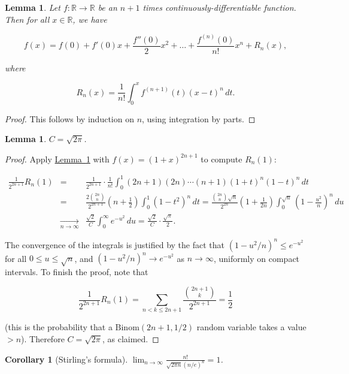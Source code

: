 \documentclass[11pt]{report}
\newcommand{\R}{\mathbb{R}}
\theoremstyle{plain}
\newtheorem{lem}[thm]{Lemma}
\newtheorem{cor}[thm]{Corollary}
\theoremstyle{definition}
\begin{document}
\begin{lem}
\label{lem-prevlemma}
Let $f:\R\to\R$ be an $n+1$ times
continuously-differentiable function. Then for all
$x\in\R$, we have

\[
f(x) = f(0) + f'(0)x + \frac{f''(0)}{2}x^2 + \ldots + \frac{f^{(n)}(0)}{n!} x^n + R_n(x),
\]

\noindent where

\[
R_n(x) = \frac{1}{n!} \int_0^x f^{(n+1)}(t)(x-t)^n\,dt.
\]

\end{lem}

\begin{proof}
This follows by induction on $n$, using integration
by parts.
\end{proof}

\begin{lem}
$C=\sqrt{2\pi}$.
\end{lem}

\begin{proof}
Apply \hyperref[lem-prevlemma]{Lemma~\ref*{lem-prevlemma}} with $f(x) = (1+x)^{2n+1}$
to compute $R_n(1)$:

\begin{eqnarray*}
\frac{1}{2^{2n+1}} R_n(1) &=& \frac{1}{2^{2n+1}} \cdot \frac{1}{n!}\int_0^1 (2n+1)(2n)\cdots (n+1)(1+t)^n (1-t)^n
\,dt \\ &=& \frac{2 \binom{2n}{n}}{2^{2n+1}} (n+\frac12) \int_0^1 (1-t^2)^n\, dt = \frac{ \binom{2n}{n} \sqrt{n}}{2^{2n}}
(1+\frac{1}{2n}) \int_0^{\sqrt{n}} \left(1-\frac{u^2}{n}\right)^n\,du \\
&\xrightarrow[n\to\infty]{} & \frac{\sqrt{2}}{C} \int_0^\infty e^{-u^2}\,du = \frac{\sqrt{2}}{C} \cdot \frac{\sqrt{\pi}}{2}.
\end{eqnarray*}

\noindent The convergence of the integrals is justified by the
fact that $(1-u^2/n)^n \le e^{-u^2}$ for all
$0\le u\le \sqrt{n}$, and $(1-u^2/n)^n \to e^{-u^2}$
as $n\to\infty$, uniformly on compact intervals. To
finish the proof, note that

\[
\frac{1}{2^{2n+1}} R_n(1) = \sum_{n<k\le 2n+1} \frac{\binom{2n+1}{k}}{2^{2n+1}} = \frac12
\]

\noindent (this is the probability that a
$\textrm{Binom}(2n+1,1/2)$ random variable takes a
value $> n$). Therefore $C=\sqrt{2\pi}$, as claimed.
\end{proof}

\begin{cor}[Stirling's formula]
$\lim_{n\to\infty} \frac{n!}{\sqrt{2\pi n}
(n/e)^n}=1$.
\end{cor}
\end{document}
